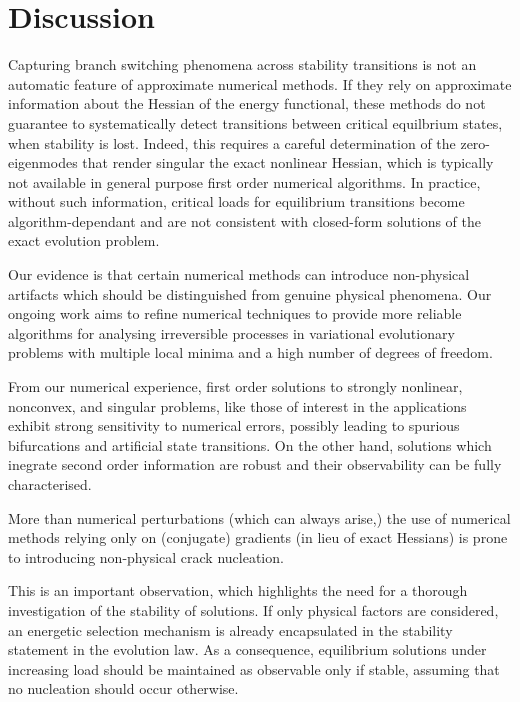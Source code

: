 
\section{Discussion} 

    Capturing branch switching phenomena across stability transitions is not an automatic feature of approximate numerical methods. If they rely on approximate information about the Hessian of the energy functional, these methods do not guarantee to systematically detect transitions between critical equilbrium states, when stability is lost. 
Indeed, this requires a careful determination of the zero-eigenmodes that render singular the exact nonlinear Hessian, which is typically not available in general purpose first order numerical algorithms.
In practice, without such information, critical loads for equilibrium transitions become algorithm-dependant and are not consistent with closed-form solutions of the exact evolution problem.
% 

Our evidence is that certain numerical methods can introduce non-physical artifacts which should be distinguished from genuine physical phenomena. Our ongoing work aims to refine numerical techniques to provide more reliable algorithms for analysing irreversible processes in variational evolutionary problems with multiple local minima and a high number of degrees of freedom.

From our numerical experience, first order solutions to strongly nonlinear, nonconvex, and singular problems, like those of interest in the applications exhibit strong sensitivity to numerical errors, possibly leading to spurious bifurcations and artificial state transitions. On the other hand, solutions which inegrate second order information are robust and their observability can be fully characterised.

More than numerical perturbations (which can always arise,) the use of numerical methods relying only on (conjugate) gradients (in lieu of exact Hessians) is prone to introducing non-physical crack nucleation.

This is an important observation, which highlights the need for a thorough investigation of the stability of solutions. 
If only physical factors are considered, an energetic selection mechanism is already encapsulated in the stability statement in the evolution law. As a consequence, equilibrium solutions under increasing load should be maintained as observable only if stable, assuming that no nucleation should occur otherwise.

